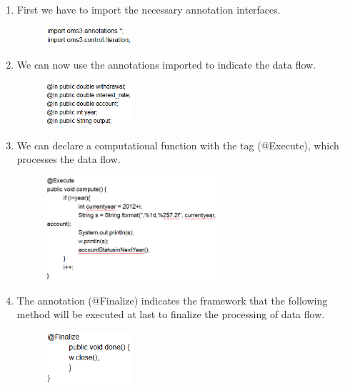 \begin{enumerate}
\item First we have to import the necessary annotation interfaces.
\begin{figure}[htbp]
\includegraphics[width=0.3\textwidth]{pics/oms/Figure2.png}
\end{figure}

\item We can now use the annotations imported to indicate the data flow.
\begin{figure}[htbp]
\includegraphics[width=0.3\textwidth]{pics/oms/Figure3.png}
\end{figure}


\item We can declare a computational function with the tag (@Execute), which processes the data flow.
\begin{figure}[htbp]
\includegraphics[width=0.6\textwidth]{pics/oms/Figure4.png}
\end{figure}

\item The annotation (@Finalize) indicates the framework that the following method will be executed at last to finalize the processing of data flow.
\begin{figure}[htbp]
\includegraphics[width=0.3\textwidth]{pics/oms/Figure5.png}
\end{figure}
\end{enumerate}


